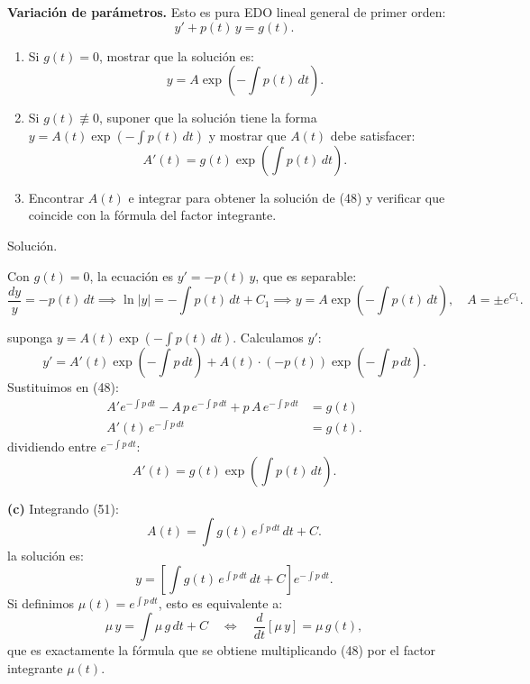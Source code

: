 \begin{respuesta}
 \textbf{Variaci\'on de par\'ametros.} Esto es pura EDO lineal general
de primer orden:
\[
  y' + p(t)\,y = g(t). \tag{48}
\]

\begin{enumerate}[label=\textbf{\alph*.}]

\item Si $g(t) = 0$, mostrar que la soluci\'on es:
\[
  y = A\exp\!\left(-\int p(t)\,dt\right). \tag{49}
\]

\item Si $g(t)\not\equiv 0$, suponer que la soluci\'on tiene la forma
$y = A(t)\exp\!\left(-\int p(t)\,dt\right)$ y mostrar que $A(t)$ debe satisfacer:
\[
  A'(t) = g(t)\exp\!\left(\int p(t)\,dt\right). \tag{51}
\]

\item Encontrar $A(t)$ e integrar para obtener la soluci\'on de (48) y verificar
que coincide con la f\'ormula del factor integrante.

\end{enumerate}

Soluci\'on.

 Con $g(t)=0$, la ecuaci\'on es $y' = -p(t)\,y$, que es separable:
\[
  \frac{dy}{y} = -p(t)\,dt
  \implies \ln|y| = -\int p(t)\,dt + C_1
  \implies y = A\exp\!\left(-\int p(t)\,dt\right), \quad A = \pm e^{C_1}.
\]

suponga $y = A(t)\exp\!\left(-\int p(t)\,dt\right)$. Calculamos $y'$:
\[
  y' = A'(t)\exp\!\left(-\int p\,dt\right) + A(t)\cdot\left(-p(t)\right)\exp\!\left(-\int p\,dt\right).
\]
Sustituimos en (48):
\begin{align*}
  A'e^{-\int p\,dt} - A\,p\,e^{-\int p\,dt} + p\,A\,e^{-\int p\,dt} &= g(t)\\
  A'(t)\,e^{-\int p\,dt} &= g(t).
\end{align*}
dividiendo entre $e^{-\int p\,dt}$:
\[
  \boxed{A'(t) = g(t)\exp\!\left(\int p(t)\,dt\right).} \tag{51}
\]

\textbf{(c)} Integrando (51):
\[
  A(t) = \int g(t)\,e^{\int p\,dt}\,dt + C.
\]
la soluci\'on es:
\[
  y = \left[\int g(t)\,e^{\int p\,dt}\,dt + C\right] e^{-\int p\,dt}.
\]
Si definimos $\mu(t) = e^{\int p\,dt}$, esto es equivalente a:
\[
  \mu\,y = \int \mu\,g\,dt + C
  \quad\Longleftrightarrow\quad
  \frac{d}{dt}[\mu\,y] = \mu\,g(t),
\]
que es exactamente la f\'ormula que se obtiene multiplicando (48) por el factor
integrante $\mu(t)$. 



    \vspace{7cm}
\end{respuesta}

